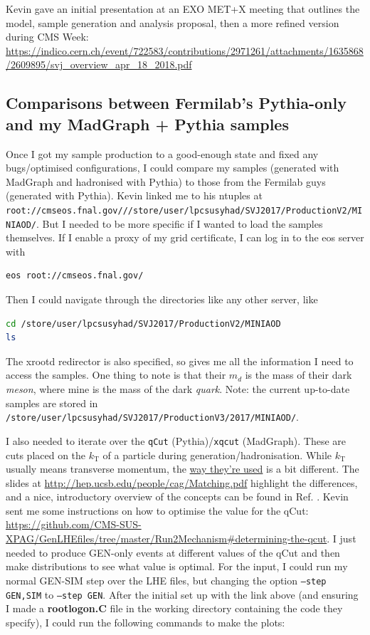 Kevin gave an initial presentation at an EXO MET+X meeting that outlines the model, sample generation and analysis proposal, then a more refined version during CMS Week: \url{https://indico.cern.ch/event/722583/contributions/2971261/attachments/1635868/2609895/svj_overview_apr_18_2018.pdf}


\subsection{Comparisons between Fermilab's Pythia-only and my MadGraph + Pythia samples}

Once I got my sample production to a good-enough state and fixed any bugs/optimised configurations, I could compare my samples (generated with MadGraph and hadronised with Pythia) to those from the Fermilab guys (generated with Pythia). Kevin linked me to his ntuples at \texttt{root://cmseos.fnal.gov///store/user/lpcsusyhad/SVJ2017/ProductionV2/MINIAOD/}. But I needed to be more specific if I wanted to load the samples themselves. If I enable a proxy of my grid certificate, I can log in to the eos server with

\begin{lstlisting}[belowskip=-0.7cm, language=sh, numbers=none]
eos root://cmseos.fnal.gov/
\end{lstlisting}

Then I could navigate through the directories like any other server, like

\begin{lstlisting}[belowskip=-0.7cm, language=sh, numbers=none]
cd /store/user/lpcsusyhad/SVJ2017/ProductionV2/MINIAOD
ls
\end{lstlisting}

The xrootd redirector is also specified, so gives me all the information I need to access the samples. One thing to note is that their $m_d$ is the mass of their dark \emph{meson}, where mine is the mass of the dark \emph{quark}. Note: the current up-to-date samples are stored in \texttt{/store/user/lpcsusyhad/SVJ2017/ProductionV3/2017/MINIAOD/}.

I also needed to iterate over the \texttt{qCut} (Pythia)/\texttt{xqcut} (MadGraph). These are cuts placed on the $k_{\mathrm{T}}$ of a particle during generation/hadronisation. While $k_{\mathrm{T}}$ usually means transverse momentum, the \uline{way they're used} is a bit different. The slides at \url{http://hep.ucsb.edu/people/cag/Matching.pdf} highlight the differences, and a nice, introductory overview of the concepts can be found in Ref. \cite{SalamJetClustering2006}. Kevin sent me some instructions on how to optimise the value for the qCut: \url{https://github.com/CMS-SUS-XPAG/GenLHEfiles/tree/master/Run2Mechanism#determining-the-qcut}. I just needed to produce GEN-only events at different values of the qCut and then make distributions to see what value is optimal. For the input, I could run my normal GEN-SIM step over the LHE files, but changing the option \texttt{--step GEN,SIM} to \texttt{--step GEN}. After the initial set up with the link above (and ensuring I made a \textbf{rootlogon.C} file in the working directory containing the code they specify), I could run the following commands to make the plots:

